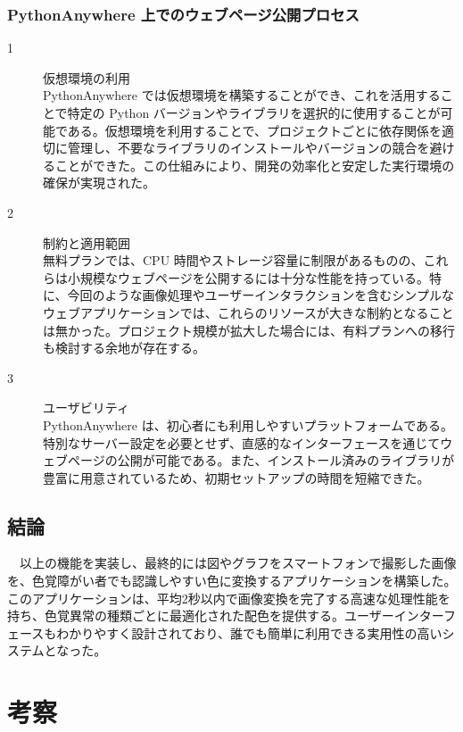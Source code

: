 \subsection{PythonAnywhere 上でのウェブページ公開プロセス}
\begin{description}
  \item[1] 仮想環境の利用\\
  PythonAnywhere では仮想環境を構築することができ、これを活用することで特定の Python バージョンやライブラリを選択的に使用することが可能である。仮想環境を利用することで、プロジェクトごとに依存関係を適切に管理し、不要なライブラリのインストールやバージョンの競合を避けることができた。この仕組みにより、開発の効率化と安定した実行環境の確保が実現された。\\
  \item[2] 制約と適用範囲\\
  無料プランでは、CPU 時間やストレージ容量に制限があるものの、これらは小規模なウェブページを公開するには十分な性能を持っている。特に、今回のような画像処理やユーザーインタラクションを含むシンプルなウェブアプリケーションでは、これらのリソースが大きな制約となることは無かった。プロジェクト規模が拡大した場合には、有料プランへの移行も検討する余地が存在する。\\
  \item[3] ユーザビリティ\\
  PythonAnywhere は、初心者にも利用しやすいプラットフォームである。特別なサーバー設定を必要とせず、直感的なインターフェースを通じてウェブページの公開が可能である。また、インストール済みのライブラリが豊富に用意されているため、初期セットアップの時間を短縮できた。
\end{description}
\section{結論}
　以上の機能を実装し、最終的には図やグラフをスマートフォンで撮影した画像を、色覚障がい者でも認識しやすい色に変換するアプリケーションを構築した。このアプリケーションは、平均2秒以内で画像変換を完了する高速な処理性能を持ち、色覚異常の種類ごとに最適化された配色を提供する。ユーザーインターフェースもわかりやすく設計されており、誰でも簡単に利用できる実用性の高いシステムとなった。

\chapter{考察}
